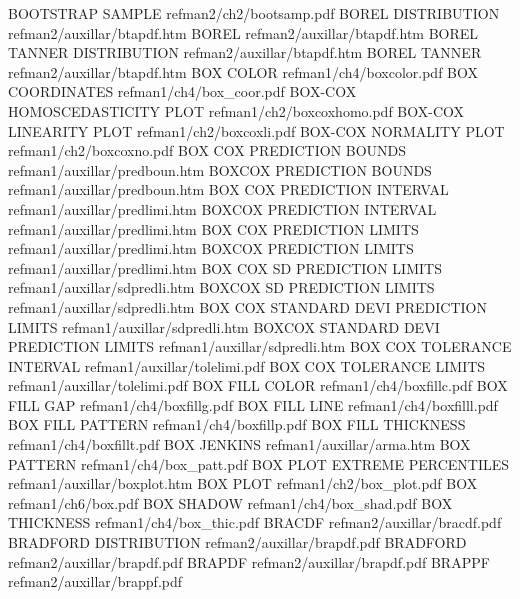 BOOTSTRAP SAMPLE                        refman2/ch2/bootsamp.pdf
BOREL DISTRIBUTION                      refman2/auxillar/btapdf.htm
BOREL                                   refman2/auxillar/btapdf.htm
BOREL TANNER DISTRIBUTION               refman2/auxillar/btapdf.htm
BOREL TANNER                            refman2/auxillar/btapdf.htm
BOX COLOR                               refman1/ch4/boxcolor.pdf
BOX COORDINATES                         refman1/ch4/box_coor.pdf
BOX-COX HOMOSCEDASTICITY PLOT           refman1/ch2/boxcoxhomo.pdf
BOX-COX LINEARITY PLOT                  refman1/ch2/boxcoxli.pdf
BOX-COX NORMALITY PLOT                  refman1/ch2/boxcoxno.pdf
BOX COX PREDICTION BOUNDS               refman1/auxillar/predboun.htm
BOXCOX PREDICTION BOUNDS                refman1/auxillar/predboun.htm
BOX COX PREDICTION INTERVAL             refman1/auxillar/predlimi.htm
BOXCOX PREDICTION INTERVAL              refman1/auxillar/predlimi.htm
BOX COX PREDICTION LIMITS               refman1/auxillar/predlimi.htm
BOXCOX PREDICTION LIMITS                refman1/auxillar/predlimi.htm
BOX COX SD PREDICTION LIMITS            refman1/auxillar/sdpredli.htm
BOXCOX SD PREDICTION LIMITS             refman1/auxillar/sdpredli.htm
BOX COX STANDARD DEVI PREDICTION LIMITS refman1/auxillar/sdpredli.htm
BOXCOX STANDARD DEVI PREDICTION LIMITS  refman1/auxillar/sdpredli.htm
BOX COX TOLERANCE INTERVAL              refman1/auxillar/tolelimi.pdf
BOX COX TOLERANCE LIMITS                refman1/auxillar/tolelimi.pdf
BOX FILL COLOR                          refman1/ch4/boxfillc.pdf
BOX FILL GAP                            refman1/ch4/boxfillg.pdf
BOX FILL LINE                           refman1/ch4/boxfilll.pdf
BOX FILL PATTERN                        refman1/ch4/boxfillp.pdf
BOX FILL THICKNESS                      refman1/ch4/boxfillt.pdf
BOX JENKINS                             refman1/auxillar/arma.htm
BOX PATTERN                             refman1/ch4/box_patt.pdf
BOX PLOT EXTREME PERCENTILES            refman1/auxillar/boxplot.htm
BOX PLOT                                refman1/ch2/box_plot.pdf
BOX                                     refman1/ch6/box.pdf
BOX SHADOW                              refman1/ch4/box_shad.pdf
BOX THICKNESS                           refman1/ch4/box_thic.pdf
BRACDF                                  refman2/auxillar/bracdf.pdf
BRADFORD DISTRIBUTION                   refman2/auxillar/brapdf.pdf
BRADFORD                                refman2/auxillar/brapdf.pdf
BRAPDF                                  refman2/auxillar/brapdf.pdf
BRAPPF                                  refman2/auxillar/brappf.pdf
